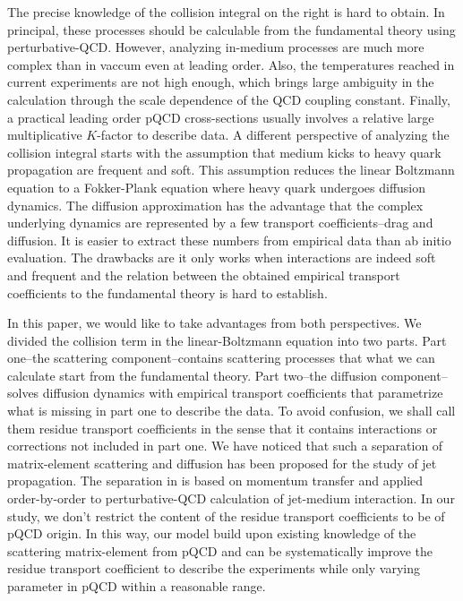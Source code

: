 \documentclass[aps, prc, reprint, amsmath, groupedaddress, nofootinbib]{revtex4-1}
\begin{document}
The precise knowledge of the collision integral on the right is hard to obtain.
In principal, these processes should be calculable from the fundamental theory using perturbative-QCD. 
However, analyzing in-medium processes are much more complex than in vaccum even at leading order. 
Also, the temperatures reached in current experiments are not high enough, which brings large ambiguity in the calculation through the scale dependence of the QCD coupling constant.
Finally, a practical leading order pQCD cross-sections usually involves a relative large multiplicative $K$-factor to describe data.
A different perspective of analyzing the collision integral starts with the assumption that medium kicks to heavy quark propagation are frequent and soft.
This assumption reduces the linear Boltzmann equation to a Fokker-Plank equation where heavy quark undergoes diffusion dynamics. 
The diffusion approximation has the advantage that the complex underlying dynamics are represented by a few transport coefficients--drag and diffusion. 
It is easier to extract these numbers from empirical data than ab initio evaluation. 
The drawbacks are it only works when interactions are indeed soft and frequent and the relation between the obtained empirical transport coefficients to the fundamental theory is hard to establish.

In this paper, we would like to take advantages from both perspectives.
We divided the collision term in the linear-Boltzmann equation into two parts.
Part one--the scattering component--contains scattering processes that what we can calculate start from the fundamental theory.
Part two--the diffusion component--solves diffusion dynamics with empirical transport coefficients that parametrize what is missing in part one to describe the data. 
To avoid confusion, we shall call them residue transport coefficients in the sense that it contains interactions or corrections not included in part one.
We have noticed that such a separation of matrix-element scattering and diffusion has been proposed for the study of jet propagation.
The separation in \cite{} is based on momentum transfer and applied order-by-order to perturbative-QCD calculation of jet-medium interaction.
In our study, we don't restrict the content of the residue transport coefficients to be of pQCD origin.
In this way, our model build upon existing knowledge of the scattering matrix-element from pQCD and can be systematically improve the residue transport coefficient to describe the experiments while only varying parameter in pQCD within a reasonable range.
\end{document}
